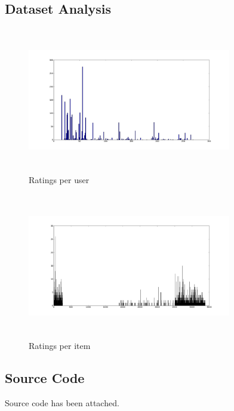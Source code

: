 \documentclass{article}
\begin{document}
\subsection{Dataset Analysis}

\begin{figure}[H]
\centering
\includegraphics[height=2.5in, width=3.5in]{ratingsperuser.png}
\caption{Ratings per user}
\label{ruser}
\end{figure}

\begin{figure}[H]
\centering
\includegraphics[height=2.5in, width=3.5in]{ratungspermovie.png}
\caption{Ratings per item}
\label{ritem}
\end{figure}




\subsection{Source Code}
Source code has been attached.
\end{document}
